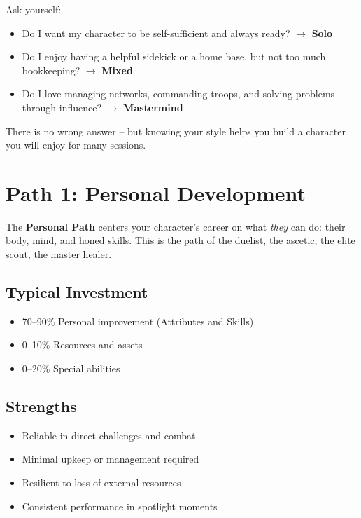 \begin{tcolorbox}[colback=cyan!5!white,colframe=cyan!75!black,title=Which Archetype Are You?,fonttitle=\bfseries,breakable]
Ask yourself:
\begin{itemize}
  \item Do I want my character to be self-sufficient and always ready? $\rightarrow$ \textbf{Solo}
  \item Do I enjoy having a helpful sidekick or a home base, but not too much bookkeeping? $\rightarrow$ \textbf{Mixed}
  \item Do I love managing networks, commanding troops, and solving problems through influence? $\rightarrow$ \textbf{Mastermind}
\end{itemize}
There is no wrong answer -- but knowing your style helps you build a character you will enjoy for many sessions.
\end{tcolorbox}


\section{Path 1: Personal Development}
\label{sec:xp-personal-path}

The \textbf{Personal Path} centers your character's career on what \emph{they}
can do: their body, mind, and honed skills. This is the path of the duelist,
the ascetic, the elite scout, the master healer.

\subsection*{Typical Investment}
\begin{itemize}
\item 70--90\% Personal improvement (Attributes and Skills)
\item 0--10\% Resources and assets
\item 0--20\% Special abilities
\end{itemize}

\subsection*{Strengths}
\begin{itemize}
\item Reliable in direct challenges and combat
\item Minimal upkeep or management required
\item Resilient to loss of external resources
\item Consistent performance in spotlight moments
\end{itemize}

